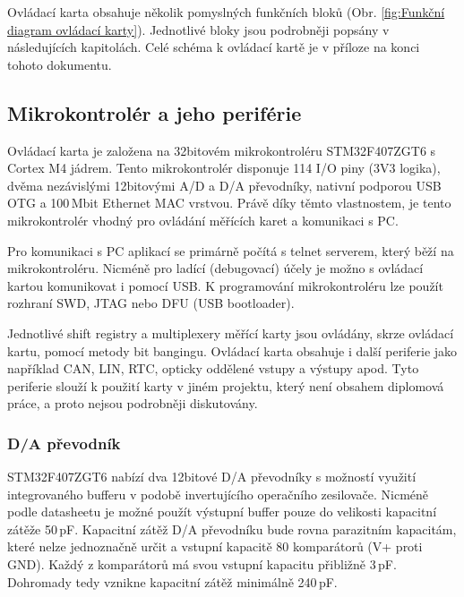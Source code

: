    Ovládací karta obsahuje několik pomyslných funkčních bloků (Obr. \ref{fig:Funkční diagram ovládací karty}).
    Jednotlivé bloky jsou podrobněji popsány v následujících kapitolách. Celé schéma k ovládací kartě je v příloze
    na konci tohoto dokumentu.

    \subsection{Mikrokontrolér a jeho periférie}
    Ovládací karta je založena na 32bitovém
    mikrokontroléru STM32F407ZGT6 s Cortex M4 jádrem.
    Tento mikrokontrolér disponuje 114 I/O piny (3V3 logika), dvěma nezávislými 12bitovými A/D a D/A převodníky,
    nativní podporou USB OTG a 100\,Mbit Ethernet MAC vrstvou. Právě díky těmto vlastnostem, je tento
    mikrokontrolér vhodný pro ovládání měřících karet a komunikaci s PC.\par

    Pro komunikaci s PC aplikací se primárně počítá s telnet serverem,
    který běží na mikrokontroléru. Nicméně pro ladící (debugovací)
    účely je možno s ovládací kartou komunikovat i pomocí USB.
    K programování mikrokontroléru lze použít rozhraní SWD, JTAG nebo DFU (USB bootloader)\cite{MARTINT}.\par

    Jednotlivé shift registry a multiplexery měřící karty jsou ovládány, skrze ovládací kartu, pomocí metody bit bangingu.
    Ovládací karta obsahuje i další periferie jako například CAN, LIN, RTC, opticky oddělené vstupy a výstupy apod.
    Tyto periferie slouží k použití karty v jiném projektu, který není obsahem diplomová práce, a proto nejsou podrobněji diskutovány.


    \subsubsection{D/A převodník}
    STM32F407ZGT6 nabízí dva 12bitové D/A převodníky s možností využití integrovaného bufferu v podobě
    invertujícího operačního zesilovače. Nicméně podle datasheetu
    je možné použít výstupní buffer pouze do velikosti kapacitní zátěže 50\,pF.
    Kapacitní zátěž D/A převodníku bude rovna parazitním kapacitám, které nelze jednoznačně určit
    a vstupní kapacitě 80 komparátorů (V+ proti GND). Každý z komparátorů má svou vstupní kapacitu
    přibližně 3\,pF. Dohromady tedy vznikne kapacitní zátěž minimálně 240\,pF.\cite{DAC}\par

